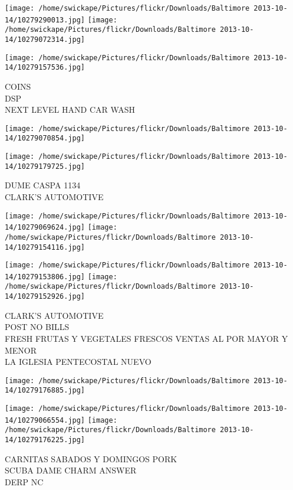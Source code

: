 \documentclass[10pt,letterpaper]{article}
\begin{document}
\texttt{[image: /home/swickape/Pictures/flickr/Downloads/Baltimore 2013-10-14/10279290013.jpg]}
\texttt{[image: /home/swickape/Pictures/flickr/Downloads/Baltimore 2013-10-14/10279072314.jpg]}

\vspace{0.25in}
\texttt{[image: /home/swickape/Pictures/flickr/Downloads/Baltimore 2013-10-14/10279157536.jpg]}

COINS\\
DSP\\
NEXT LEVEL HAND CAR WASH
\pagebreak

\texttt{[image: /home/swickape/Pictures/flickr/Downloads/Baltimore 2013-10-14/10279070854.jpg]}

\vspace{0.25in}
\texttt{[image: /home/swickape/Pictures/flickr/Downloads/Baltimore 2013-10-14/10279179725.jpg]}

DUME CASPA 1134\\
CLARK'S AUTOMOTIVE
\pagebreak

\texttt{[image: /home/swickape/Pictures/flickr/Downloads/Baltimore 2013-10-14/10279069624.jpg]}
\texttt{[image: /home/swickape/Pictures/flickr/Downloads/Baltimore 2013-10-14/10279154116.jpg]}

\texttt{[image: /home/swickape/Pictures/flickr/Downloads/Baltimore 2013-10-14/10279153806.jpg]}
\texttt{[image: /home/swickape/Pictures/flickr/Downloads/Baltimore 2013-10-14/10279152926.jpg]}

CLARK'S AUTOMOTIVE\\
POST NO BILLS\\
FRESH FRUTAS Y VEGETALES FRESCOS VENTAS AL POR MAYOR Y MENOR\\
LA IGLESIA PENTECOSTAL NUEVO
\pagebreak

\texttt{[image: /home/swickape/Pictures/flickr/Downloads/Baltimore 2013-10-14/10279176885.jpg]}

\vspace{0.25in}
\texttt{[image: /home/swickape/Pictures/flickr/Downloads/Baltimore 2013-10-14/10279066554.jpg]}
\texttt{[image: /home/swickape/Pictures/flickr/Downloads/Baltimore 2013-10-14/10279176225.jpg]}

CARNITAS SABADOS Y DOMINGOS PORK\\
SCUBA DAME CHARM ANSWER\\
DERP NC
\pagebreak
\end{document}
